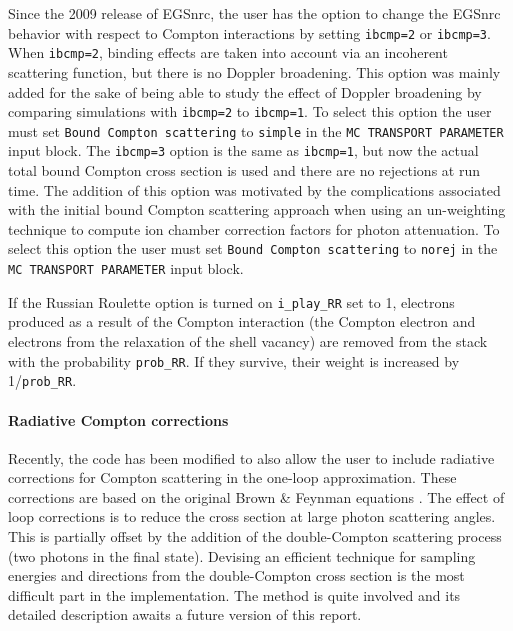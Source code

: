 Since the 2009 release of EGSnrc, the user has the option to change
the EGSnrc behavior with respect to Compton interactions by
setting {\tt ibcmp=2} or {\tt ibcmp=3}.
When {\tt ibcmp=2}, binding effects are taken into account via an
incoherent scattering function, but there is no Doppler broadening.
This option was mainly added for the sake of being able to study the
effect of Doppler broadening by comparing simulations with
{\tt ibcmp=2} to {\tt ibcmp=1}. To select this option the user
must set {\tt Bound Compton scattering} to {\tt simple} in the
{\tt MC TRANSPORT PARAMETER} input block.
The {\tt ibcmp=3} option is the same as {\tt ibcmp=1}, but now the actual total
bound Compton cross section
is used and there are no rejections at run time. The addition of this option
was motivated by the complications associated with the initial bound
Compton scattering approach when using an un-weighting technique to compute
ion chamber correction factors for photon attenuation.
To select this option the user
must set {\tt Bound Compton scattering} to {\tt norej} in the
{\tt MC TRANSPORT PARAMETER} input block.

If the Russian Roulette option is turned on {\tt i\_play\_RR} set
to 1, electrons produced as a result of the Compton interaction
(the Compton electron and electrons from the relaxation of
the shell vacancy) are removed from the stack with the probability
{\tt prob\_RR}. If they survive, their weight is increased by
1/{\tt prob\_RR}.

\paragraph{Radiative Compton corrections}\hfill
{}
\label{radc_corrections}

Recently, the code has been modified to also allow the user to include
radiative corrections for Compton scattering in the one-loop approximation.
These corrections are based on the original
Brown \& Feynman equations \cite{BF52}. The effect of loop corrections is to
reduce the cross section at large photon scattering angles. This is partially
offset by the addition of the double-Compton scattering process (two photons in
the final state). Devising an efficient technique for sampling energies and
directions from the double-Compton cross section is the most difficult part
in the implementation. The method is quite involved and its detailed description
awaits a future version of this report.

